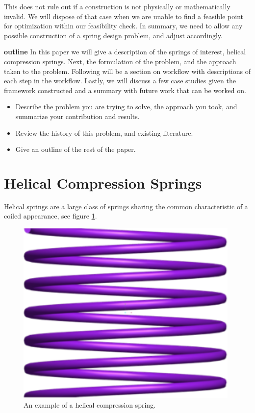 \documentclass[10pt]{article}
\begin{document}
This does not rule out if a construction is not physically or mathematically invalid. We will dispose of that case when we are unable to find a feasible point for optimization within our feasibility check. In summary, we need to allow any possible construction of a spring design problem, and adjust accordingly. 


\textbf{outline}
In this paper we will give a description of the springs of interest, helical compression springs. Next, the formulation of the problem, and the approach taken to the problem. Following will be a section on workflow with descriptions of each step in the workflow. Lastly, we will discuss a few case studies given the framework constructed and a summary with future work that can be worked on.



\begin{itemize}
\item Describe the problem you are trying to solve, the approach
you took, and summarize your contribution and results.

\item Review the history of this problem, and existing literature.

\item Give an outline of the rest of the paper.
\end{itemize}

\section{Helical Compression Springs}

Helical springs are a large class of springs sharing the common characteristic of a coiled appearance, see figure \ref{Spring}. 

		\begin{figure}[h]
		 \begin{center}\includegraphics[scale=.2]{Spring.png}\end{center}
		 \caption{An example of a helical compression spring.}
		 \label{Spring}
		 
		 \end{figure}
\end{document}
